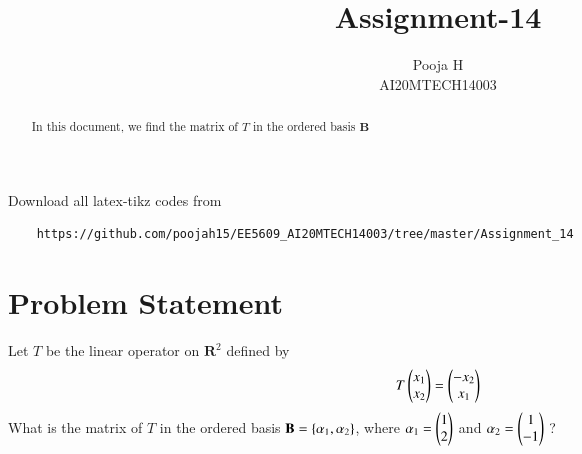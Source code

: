 \documentclass[journal,12pt,twocolumn]{IEEEtran}
\begin{document}
	\makeatother
	\let\StandardTheFigure\thefigure
	\let\vec\mathbf
	\renewcommand{\thefigure}{\theproblem}
	\def\putbox#1#2#3{\makebox[0in][l]{\makebox[#1][l]{}\raisebox{\baselineskip}[0in][0in]{\raisebox{#2}[0in][0in]{#3}}}}
	\def\rightbox#1{\makebox[0in][r]{#1}}
	\def\centbox#1{\makebox[0in]{#1}}
	\def\topbox#1{\raisebox{-\baselineskip}[0in][0in]{#1}}
	\def\midbox#1{\raisebox{-0.5\baselineskip}[0in][0in]{#1}}
	\vspace{3cm}
	\title{Assignment-14}
	\author{Pooja H \\ AI20MTECH14003}
	\maketitle
	\newpage
	\bigskip
	\renewcommand{\thefigure}{\theenumi}
	\renewcommand{\thetable}{\theenumi}
	\begin{abstract}
		In this document, we find the matrix of $T$ in the ordered basis $ \vec{B}$
	\end{abstract}
	Download all latex-tikz codes from 
\begin{lstlisting}
	https://github.com/poojah15/EE5609_AI20MTECH14003/tree/master/Assignment_14
\end{lstlisting}
	\section{Problem Statement}
	Let $T$ be the linear operator on $\vec{R}^2$ defined by 
	\begin{align}
		T\begin{pmatrix}x_1\\ x_2\end{pmatrix} = \begin{pmatrix}-x_2\\ x_1\end{pmatrix} 
	\end{align}
	What is the matrix of $T$ in the ordered basis $\vec{B} = \cbrak{ \vec{ \alpha }_1, \vec{\alpha}_2}$, where $\vec{\alpha}_1 = \myvec{1\\ 2}$ and $\vec{\alpha}_2 = \myvec{1 \\ -1}$ ?
\end{document}
